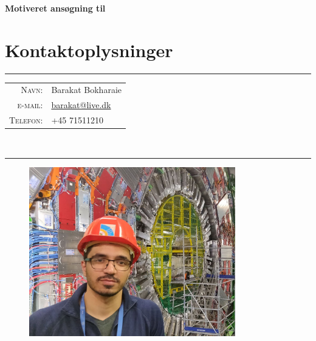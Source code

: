 \documentclass[../Ansoegning.tex]{subfiles}
\begin{document}
\vspace{-0.5cm}
\par{\centering
		{\Large \textbf{Motiveret ansøgning til \FondNavn}} \par}
\begin{minipage}[t][1.3cm][t]{0.7\textwidth}\vspace{\VRuleDistBig}
\section*{Kontaktoplysninger}
\rule{0.7\textwidth}{0.5pt}
\begin{tabular}{r|l}
    \textsc{Navn:}      & Barakat Bokharaie                                 \\
    \textsc{e-mail:}    &   \href{mailto:barakat@live.dk}{barakat@live.dk}  \\
    \textsc{Telefon:}   & +45 71511210                                       \\
    
\end{tabular}\\
\rule{0.7\textwidth}{0.5pt}
\end{minipage} \hfill
\begin{minipage}[t][1.5cm][t]{0.3\textwidth}
\vspace{-1cm}
\begin{figure}[H]
	\flushright
	\includegraphics[width=0.8\textwidth]{Billeder/mig.png}
\end{figure}
\end{minipage}
\end{document}
